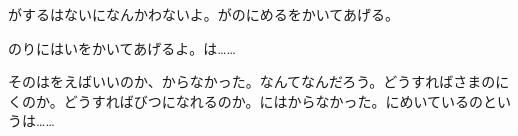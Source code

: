 がするはないになんかわないよ。がのにめるをかいてあげる。

のりにはいをかいてあげるよ。は……

そのはをえばいいのか、からなかった。なんてなんだろう。どうすればさまのにくのか。どうすればびつになれるのか。にはからなかった。にめいているのというは……



